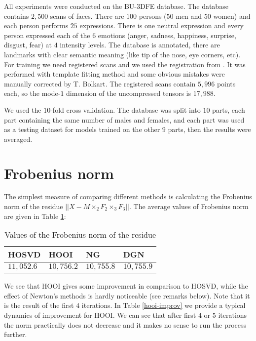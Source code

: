 All experiments were conducted on the BU-3DFE database. The database contains $2,500$ scans of faces. There are $100$
persons ($50$ men and $50$ women) and each person performs $25$ expressions.
There is one neutral expression and every person expressed each of the $6$ emotions (anger, sadness,
happiness, surprise, disgust, fear) at $4$ intensity levels. The database is annotated, there are landmarks
with clear semantic meaning (like tip of the nose, eye corners, etc).
For training we need registered scans and we used the registration 
from \cite{Salazar}. It was performed with template fitting method
and some obvious mistakes were manually corrected by T. Bolkart.
The registered scans contain $5,996$ points each, so the mode-$1$ dimension
of the  uncompressed tensors is $17,988$.

We used the {$10$-fold} cross validation. 
The database was split into $10$ parts, each part containing the same number of males and females, and
each part was used as a testing dataset for models trained on the other $9$ parts, then the results
were averaged.

\section{Frobenius norm}

The simplest measure of comparing different methods
is calculating the Frobenius norm of the residue $|| X - M \times_2 F_2 \times_3 F_3 ||$.
The average values of Frobenius norm are given in {Table \ref{frob-norm-residue}}:


\begin{table}[h]
\centering
\begin{tabular}{|l|l|l|l|}
\hline
HOSVD & HOOI & NG & DGN \\ \hline
$11,052.6$  & $10,756.2$  & $10,755.8$ & $10,755.9$ \\ \hline
\end{tabular}
\caption{Values of the Frobenius norm of the residue}
\label{frob-norm-residue}
\end{table}


We see that HOOI gives some improvement in comparison to HOSVD,
while the effect of Newton's methods is hardly noticeable (see remarks below). Note that it is the result of the
first $4$ iterations. In {Table \ref{hooi-improv}} we provide a typical dynamics of improvement
for HOOI. We can see that  after first $4$ or $5$ iterations the norm practically 
does not decrease and it makes no sense to run the process further.



